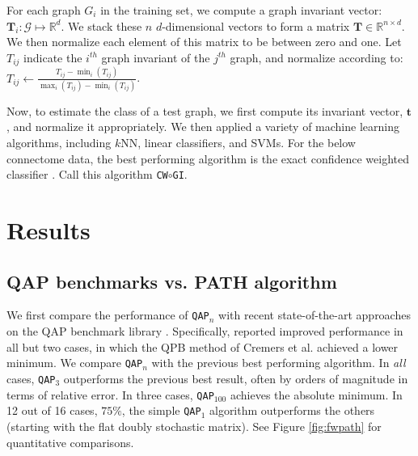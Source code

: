 \documentclass{article} %
\newcommand{\T}{^{\ensuremath{\mathsf{T}}}}           %
\newcommand{\EE}{\mathbb{E}}           %
\providecommand{\mc}[1]{\mathcal{#1}}
\providecommand{\mb}[1]{\boldsymbol{#1}}
\newcommand{\Real}{\mathbb{R}}
\newcommand{\qapa}{\texttt{QAP}$_1$ }
\newcommand{\qapn}{\texttt{QAP$_n$} }
\newcommand{\qapb}{\texttt{QAP$_{100}$} }
\begin{document}
For each graph $G_i$ in the training set, we compute a graph invariant vector: $\mb{T}_i: \mc{G} \mapsto \Real^d$.  We stack these $n$ $d$-dimensional vectors to form a matrix $\mb{T} \in \Real^{n \times d}$. We then normalize each element of this matrix to be between zero and one. Let $T_{ij}$ indicate the $i^{th}$ graph invariant of the $j^{th}$ graph, and normalize according to:  $T_{ij} \leftarrow \frac{T_{ij} - \min_i (T_{ij})}{\max_i(T_{ij}) - \min_i(T_{ij})}$.

Now, to estimate the class of a test graph, we first compute its invariant vector, $\mb{t}$, and normalize it appropriately.  We then applied a variety of machine learning algorithms, including $k$NN, linear classifiers, and SVMs.  For the below connectome data, the best performing algorithm is the exact confidence weighted classifier \cite{Crammer2008}.  Call this algorithm \texttt{CW}$\circ$\texttt{GI}.




\section{Results}

\subsection{QAP benchmarks vs. PATH algorithm}

We first compare the performance of \qapn with recent state-of-the-art approaches on the QAP benchmark library \cite{Burkard1997}.  Specifically, \cite{Zaslavskiy2009} reported improved performance in all but two cases, in which the QPB method of Cremers et al. \cite{Schellewald2001} achieved a lower minimum.  We compare \qapn with the previous best performing algorithm.  In \emph{all} cases, \texttt{QAP}$_3$ outperforms the previous best result, often by orders of magnitude in terms of relative error. In three cases, \qapb achieves the absolute minimum.  In 12 out of 16 cases, $75\%$, the simple \qapa algorithm outperforms the others (starting with the flat doubly stochastic matrix).  See Figure \ref{fig:fwpath} for quantitative comparisons.
\end{document}
